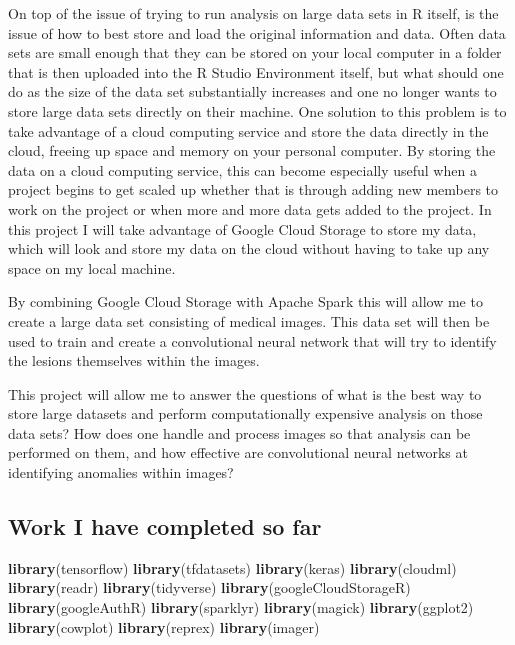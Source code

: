 \documentclass[12pt]{article}
\newenvironment{Shaded}{\begin{snugshade}}{\end{snugshade}}
\newcommand{\KeywordTok}[1]{\textcolor[rgb]{0.13,0.29,0.53}{\textbf{#1}}}
\newcommand{\NormalTok}[1]{#1}
\begin{document}
On top of the issue of trying to run analysis on large data sets in R
itself, is the issue of how to best store and load the original
information and data. Often data sets are small enough that they can be
stored on your local computer in a folder that is then uploaded into the
R Studio Environment itself, but what should one do as the size of the
data set substantially increases and one no longer wants to store large
data sets directly on their machine. One solution to this problem is to
take advantage of a cloud computing service and store the data directly
in the cloud, freeing up space and memory on your personal computer. By
storing the data on a cloud computing service, this can become
especially useful when a project begins to get scaled up whether that is
through adding new members to work on the project or when more and more
data gets added to the project. In this project I will take advantage of
Google Cloud Storage to store my data, which will look and store my data
on the cloud without having to take up any space on my local machine.

By combining Google Cloud Storage with Apache Spark this will allow me
to create a large data set consisting of medical images. This data set
will then be used to train and create a convolutional neural network
that will try to identify the lesions themselves within the images.

This project will allow me to answer the questions of what is the best
way to store large datasets and perform computationally expensive
analysis on those data sets? How does one handle and process images so
that analysis can be performed on them, and how effective are
convolutional neural networks at identifying anomalies within images?

\hypertarget{work-i-have-completed-so-far}{%
\subsection{Work I have completed so
far}\label{work-i-have-completed-so-far}}

\begin{Shaded}
\begin{Highlighting}[]
\KeywordTok{library}\NormalTok{(tensorflow)}
\KeywordTok{library}\NormalTok{(tfdatasets)}
\KeywordTok{library}\NormalTok{(keras)}
\KeywordTok{library}\NormalTok{(cloudml)}
\KeywordTok{library}\NormalTok{(readr) }
\KeywordTok{library}\NormalTok{(tidyverse)}
\KeywordTok{library}\NormalTok{(googleCloudStorageR)}
\KeywordTok{library}\NormalTok{(googleAuthR)}
\KeywordTok{library}\NormalTok{(sparklyr)}
\KeywordTok{library}\NormalTok{(magick)}
\KeywordTok{library}\NormalTok{(ggplot2)}
\KeywordTok{library}\NormalTok{(cowplot)}
\KeywordTok{library}\NormalTok{(reprex)}
\KeywordTok{library}\NormalTok{(imager)}
\end{Highlighting}
\end{Shaded}
\end{document}
